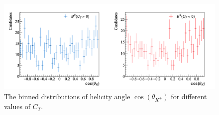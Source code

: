 \begin{figure}[h]
\center
\includegraphics*[width=0.96\linewidth]{CM_variables_B0/B0_helangle_KpPim_1000}
\caption{The binned distributions of helicity angle $\cos(\theta_{K^+})$ for different values of $C_T$.}
\label{thetakpiv2}
\end{figure}

